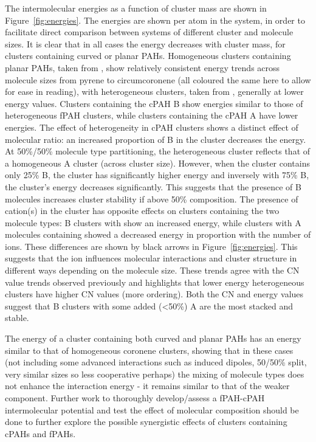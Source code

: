 The intermolecular energies as a function of cluster mass are shown in Figure~\ref{fig:energies}.  The energies are shown per atom in the system, in order to facilitate direct comparison between systems of different cluster and molecule sizes. It is clear that in all cases the energy decreases with cluster mass, for clusters containing curved or planar PAHs. Homogeneous clusters containing planar PAHs, taken from \citet{chen2014size,chen2015solid}, show relatively consistent energy trends across molecule sizes from pyrene to circumcoronene (all coloured the same here to allow for ease in reading), with heterogeneous clusters, taken from \citet{bowal2018partitioning}, generally at lower energy values. Clusters containing the cPAH B show energies similar to those of heterogeneous fPAH clusters, while clusters containing the cPAH A have lower energies.
The effect of heterogeneity in cPAH clusters shows a distinct effect of molecular ratio: an increased proportion of B in the cluster decreases the energy. At 50\%/50\% molecule type partitioning, the heterogeneous cluster reflects that of a homogeneous A cluster (across cluster size). However, when the cluster contains only 25\% B, the cluster has significantly higher energy and inversely with 75\% B, the cluster's energy decreases significantly.  This suggests that the presence of B molecules increases cluster stability if above 50\% composition.
The presence of cation(s) in the cluster has opposite effects on clusters containing the two molecule types: B clusters with  show an increased energy, while clusters with A molecules containing  showed a decreased energy in proportion with the number of ions.  These differences are shown by black arrows in Figure~\ref{fig:energies}. This suggests that the ion influences molecular interactions and cluster structure in different ways depending on the molecule size. These trends agree with the CN value trends observed previously and highlights that lower energy heterogeneous clusters have higher CN values (more ordering). %
Both the CN and energy values suggest that B clusters with some added (<50\%) A are the most stacked and stable.

The energy of a cluster containing both curved and planar PAHs has an energy similar to that of homogeneous coronene clusters, showing that in these cases (not including some advanced interactions such as induced dipoles, 50/50\% split, very similar sizes so less cooperative perhaps) the mixing of molecule types does not enhance the interaction energy - it remains similar to that of the weaker component.  Further work to thoroughly develop/assess a fPAH-cPAH intermolecular potential and test the effect of molecular composition should be done to further explore the possible synergistic effects of clusters containing cPAHs and fPAHs. %

